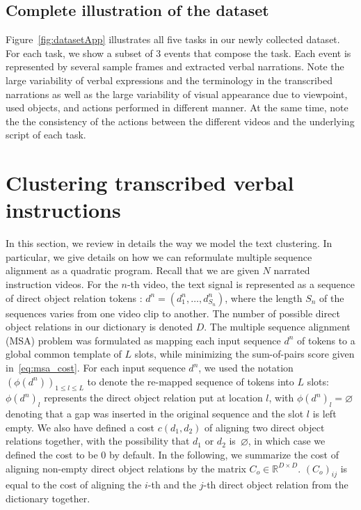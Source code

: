 \documentclass[10pt,twocolumn,letterpaper]{article}
\newcommand{\Ctext}{C_o} %
\begin{document}
\subsection{Complete illustration of the dataset}

%
Figure~\ref{fig:datasetApp} illustrates all five tasks in our newly collected dataset.
For each task, we show a subset of 3 events that compose the task.
Each event is represented by several sample frames and extracted verbal narrations.
Note the large variability of verbal expressions and the terminology in the transcribed narrations as well as the large variability of visual appearance  due to viewpoint, used objects, and actions performed in different manner.
At the same time, note the the consistency of the actions between the different videos and the underlying script of each task.
%


%
%
\section{Clustering transcribed verbal instructions}
%
\label{app:text_msa}
In this section, we review in details the way we model the text clustering.
In particular, we give details on how we can reformulate multiple sequence alignment as a quadratic program.
Recall that we are given $N$ narrated instruction videos.
For the $n$-th video, the text signal is represented as a sequence of direct object relation tokens : $d^n=(d_1^n,\dots,d^n_{S_n})$, where the length $S_n$ of the sequences varies from one video clip to another.
The number of possible direct object relations in our dictionary is denoted $D$.
The multiple sequence alignment (MSA) problem was formulated
as mapping each input sequence $d^n$ of tokens to a global common
template of $L$ slots, while minimizing the sum-of-pairs score given in~\eqref{eq:msa_cost}.
For each input sequence $d^n$, we used the notation $(\phi(d^n))_{1\leq l\leq L}$
to denote the re-mapped sequence of tokens into $L$ slots: $\phi(d^n)_l$
represents the direct object relation put at location $l$, with $\phi(d^n)_l = \varnothing$
denoting that a gap was inserted in the original sequence and
the slot $l$ is left empty.
We also have defined a cost $c(d_1, d_2)$ of aligning two direct object 
relations together, with the possibility that $d_1$ or $d_2$
is~$\varnothing$, in which case we defined the cost to be $0$
by default.
In the following, we summarize the cost of aligning non-empty
direct object relations
by the matrix $\Ctext\in\mathbb{R}^{D\times D}$.
$(\Ctext)_{ij}$ is equal to the cost of aligning the $i$-th and the 
$j$-th direct object relation from the dictionary together.
\end{document}

